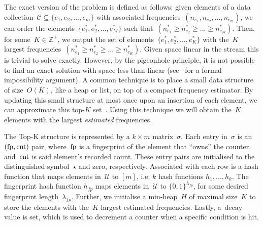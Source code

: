 The exact version of the problem is defined as follows: given elements of a data collection~$\mathcal{C} \subseteq  \{ e_1,e_2,...,e_m \}$ with associated frequencies~$(n_{e_1},n_{e_2},...,n_{e_m})$, we can order the elements~$\{ e^{*}_{1},e^{*}_{2},...,e^{*}_{M} \}$ such that~$(n^{*}_{e_1} \geq n^{*}_{e_2} \geq ... \geq n^{*}_{e_M})$. Then, for some~$K \in \mathbb{Z}^{+}$, we output the set of elements~$\{ e^{*}_{1},e^{*}_{2},...,e^{*}_{K} \}$ with the~$K$ largest frequencies~$(n^{*}_{e_1} \geq n^{*}_{e_2} \geq ... \geq n^{*}_{e_K})$. Given space linear in the stream this is trivial to solve exactly. However, by the pigeonhole principle, it is not possible to find an exact solution with space less than linear (see~\cite{Roughgarden_Valiant} for a formal impossibility argument).
A common technique is to place a small data structure of size~$O(K)$, like a heap or list, on top of a compact frequency estimator. By updating this small structure at most once upon an insertion of each element, we can approximate this top-$K$ set~\cite{mandal2018topkapi,metwally2006}. Using this technique we will obtain the~$K$ elements with the largest \emph{estimated} frequencies. 

The Top-K structure is represented by a $k{ \times} m$ matrix~$\sigma$. Each entry in~$\sigma$ is an $(\textup{fp},\textup{cnt})$ pair, where~$\textup{fp}$ is a fingerprint of the element that ``owns'' the counter, and~$\textup{cnt}$ is said element's recorded count. These entry pairs are initialised to the distinguished symbol~$\star$ and zero, respectively. Associated with each row is a hash function that maps elements in~$\mathcal{U}$ to $[m]$, i.e. $k$ hash functions $h_1,...,h_k$. The fingerprint hash function $h_\mathit{fp}$ maps elements in~$\mathcal{U}$ to $\{ 0,1 \}^{\lambda_{\mathit{fp}}}$, for some desired fingerprint length~$\lambda_{\mathit{fp}}$. Further, we initialise a min-heap~$H$ of maximal size~$K$ to store the elements with the~$K$ largest estimated frequencies. Lastly, a~$\mathrm{decay}$ value is set, which is used to decrement a counter when a specific condition is hit. 

